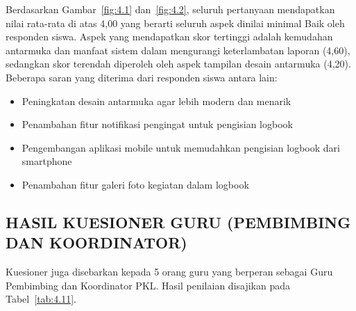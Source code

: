 Berdasarkan Gambar~\ref{fig:4.1} dan~\ref{fig:4.2}, seluruh pertanyaan mendapatkan nilai rata-rata di atas 4,00 yang berarti seluruh aspek dinilai minimal Baik oleh responden siswa. Aspek yang mendapatkan skor tertinggi adalah kemudahan antarmuka dan manfaat sistem dalam mengurangi keterlambatan laporan (4,60), sedangkan skor terendah diperoleh oleh aspek tampilan desain antarmuka (4,20). Beberapa saran yang diterima dari responden siswa antara lain:

\begin{itemize}
\item Peningkatan desain antarmuka agar lebih modern dan menarik
\item Penambahan fitur notifikasi pengingat untuk pengisian logbook
\item Pengembangan aplikasi mobile untuk memudahkan pengisian logbook dari smartphone
\item Penambahan fitur galeri foto kegiatan dalam logbook
\end{itemize}

\subsection{HASIL KUESIONER GURU (PEMBIMBING DAN KOORDINATOR)}

Kuesioner juga disebarkan kepada 5 orang guru yang berperan sebagai Guru Pembimbing dan Koordinator PKL. Hasil penilaian disajikan pada Tabel~\ref{tab:4.11}.

